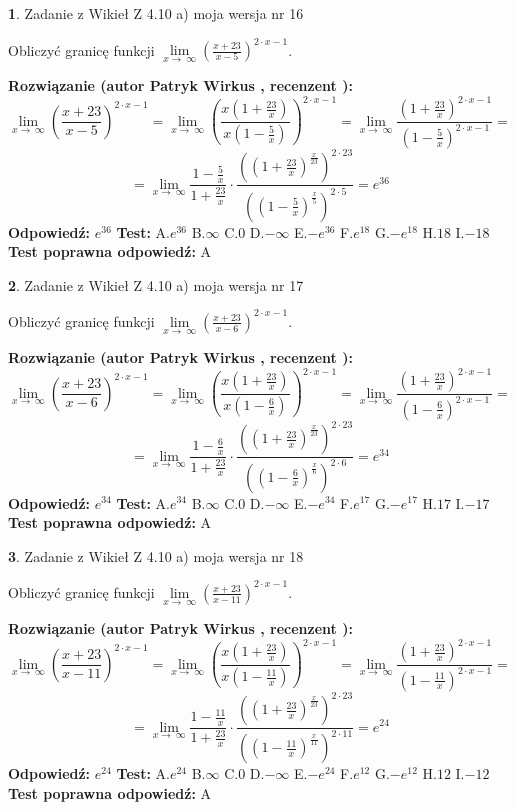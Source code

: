\documentclass[12pt, a4paper]{article}
\theoremstyle{definition} %
\newtheorem{zad}{}
\newcommand{\zadStart}[1]{\begin{zad}#1\newline}
\newcommand{\zadStop}{\end{zad}}
\newcommand{\rozwStart}[2]{\noindent \textbf{Rozwiązanie (autor #1 , recenzent #2): }\newline}
\newcommand{\rozwStop}{\newline}
\newcommand{\odpStart}{\noindent \textbf{Odpowiedź:}\newline}
\newcommand{\odpStop}{\newline}
\newcommand{\testStart}{\noindent \textbf{Test:}\newline}
\newcommand{\testStop}{\newline}
\newcommand{\kluczStart}{\noindent \textbf{Test poprawna odpowiedź:}\newline}
\newcommand{\kluczStop}{\newline}
\begin{document}
\zadStart{Zadanie z Wikieł Z 4.10 a) moja wersja nr 16}

Obliczyć granicę funkcji  $\lim\limits_{x\to\ \infty}(\frac{x+23}{x-5})^{2\cdot x-1}$.
\zadStop
\rozwStart{Patryk Wirkus}{}
$$\lim\limits_{x\to\ \infty}(\frac{x+23}{x-5})^{2\cdot x-1} = \lim\limits_{x\to\ \infty}(\frac{x(1+\frac{23}{x})}{x(1-\frac{5}{x})})^{2\cdot x-1}=\lim\limits_{x\to\ \infty}\frac{(1+\frac{23}{x})^{2\cdot x-1}}{(1-\frac{5}{x})^{2\cdot x-1}}=$$
$$=\lim\limits_{x\to\ \infty}\frac{1-\frac{5}{x}}{1+\frac{23}{x}}\cdot\frac{((1+\frac{23}{x})^{\frac{x}{23}})^{2\cdot23}}{((1-\frac{5}{x})^{\frac{x}{5}})^{2\cdot5}}=e^{36}$$
\rozwStop
\odpStart
$e^{36}$
\odpStop
\testStart
A.$e^{36}$ B.$\infty$ C.$0$ D.$-\infty$ E.$-e^{36}$
F.$e^{18}$ G.$-e^{18}$
H.$18$
I.$-18$
\testStop
\kluczStart
A
\kluczStop



\zadStart{Zadanie z Wikieł Z 4.10 a) moja wersja nr 17}

Obliczyć granicę funkcji  $\lim\limits_{x\to\ \infty}(\frac{x+23}{x-6})^{2\cdot x-1}$.
\zadStop
\rozwStart{Patryk Wirkus}{}
$$\lim\limits_{x\to\ \infty}(\frac{x+23}{x-6})^{2\cdot x-1} = \lim\limits_{x\to\ \infty}(\frac{x(1+\frac{23}{x})}{x(1-\frac{6}{x})})^{2\cdot x-1}=\lim\limits_{x\to\ \infty}\frac{(1+\frac{23}{x})^{2\cdot x-1}}{(1-\frac{6}{x})^{2\cdot x-1}}=$$
$$=\lim\limits_{x\to\ \infty}\frac{1-\frac{6}{x}}{1+\frac{23}{x}}\cdot\frac{((1+\frac{23}{x})^{\frac{x}{23}})^{2\cdot23}}{((1-\frac{6}{x})^{\frac{x}{6}})^{2\cdot6}}=e^{34}$$
\rozwStop
\odpStart
$e^{34}$
\odpStop
\testStart
A.$e^{34}$ B.$\infty$ C.$0$ D.$-\infty$ E.$-e^{34}$
F.$e^{17}$ G.$-e^{17}$
H.$17$
I.$-17$
\testStop
\kluczStart
A
\kluczStop



\zadStart{Zadanie z Wikieł Z 4.10 a) moja wersja nr 18}

Obliczyć granicę funkcji  $\lim\limits_{x\to\ \infty}(\frac{x+23}{x-11})^{2\cdot x-1}$.
\zadStop
\rozwStart{Patryk Wirkus}{}
$$\lim\limits_{x\to\ \infty}(\frac{x+23}{x-11})^{2\cdot x-1} = \lim\limits_{x\to\ \infty}(\frac{x(1+\frac{23}{x})}{x(1-\frac{11}{x})})^{2\cdot x-1}=\lim\limits_{x\to\ \infty}\frac{(1+\frac{23}{x})^{2\cdot x-1}}{(1-\frac{11}{x})^{2\cdot x-1}}=$$
$$=\lim\limits_{x\to\ \infty}\frac{1-\frac{11}{x}}{1+\frac{23}{x}}\cdot\frac{((1+\frac{23}{x})^{\frac{x}{23}})^{2\cdot23}}{((1-\frac{11}{x})^{\frac{x}{11}})^{2\cdot11}}=e^{24}$$
\rozwStop
\odpStart
$e^{24}$
\odpStop
\testStart
A.$e^{24}$ B.$\infty$ C.$0$ D.$-\infty$ E.$-e^{24}$
F.$e^{12}$ G.$-e^{12}$
H.$12$
I.$-12$
\testStop
\kluczStart
A
\kluczStop
\end{document}
